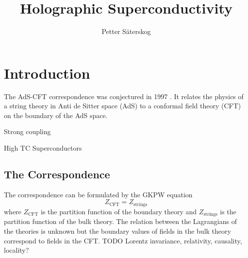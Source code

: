 \documentclass[12pt]{report}
\title{Holographic Superconductivity}
\author{Petter Säterskog}
\begin{document}
\maketitle
\tableofcontents
\chapter{Introduction}
The AdS-CFT correspondence was conjectured in 1997 \cite{Maldacena:1997re}. It relates the physics of a string theory in Anti de Sitter space (AdS) to a conformal field theory (CFT) on the boundary of the AdS space.

Strong coupling

High TC Superconductors
\section{The Correspondence}
The correspondence can be formulated by the GKPW equation \cite{Witten:1998qj}
\begin{equation}
 Z_{\text{CFT}}=Z_{\text{strings}}
\label{GKPW}
\end{equation}
where $Z_{\text{CFT}}$ is the partition function of the boundary theory and $Z_{\text{strings}}$ is the partition function of the bulk theory. The relation between the Lagrangians of the theories is unknown but the boundary values of fields in the bulk theory correspond to fields in the CFT.
TODO
Lorentz invariance, relativity, causality, locality?
\end{document}
